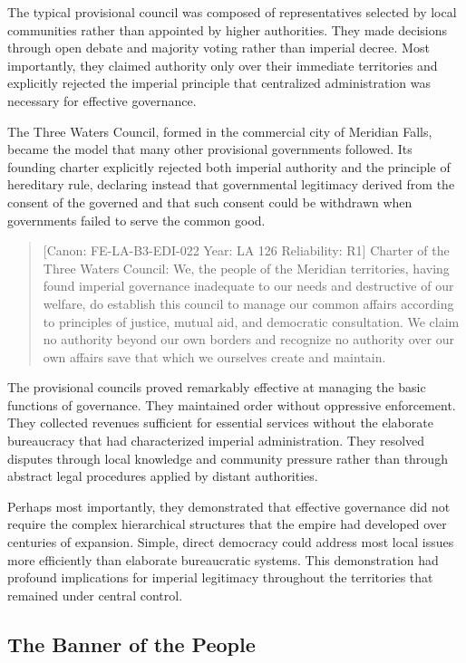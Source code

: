 The typical provisional council was composed of representatives selected
by local communities rather than appointed by higher authorities. They
made decisions through open debate and majority voting rather than
imperial decree. Most importantly, they claimed authority only over
their immediate territories and explicitly rejected the imperial
principle that centralized administration was necessary for effective
governance.

The Three Waters Council, formed in the commercial city of Meridian
Falls, became the model that many other provisional governments
followed. Its founding charter explicitly rejected both imperial
authority and the principle of hereditary rule, declaring instead that
governmental legitimacy derived from the consent of the governed and
that such consent could be withdrawn when governments failed to serve
the common good.

\begin{quote}
{[}Canon: FE-LA-B3-EDI-022 \textbar{} Year: LA 126 \textbar{}
Reliability: R1{]} Charter of the Three Waters Council: We, the people
of the Meridian territories, having found imperial governance inadequate
to our needs and destructive of our welfare, do establish this council
to manage our common affairs according to principles of justice, mutual
aid, and democratic consultation. We claim no authority beyond our own
borders and recognize no authority over our own affairs save that which
we ourselves create and maintain.
\end{quote}

The provisional councils proved remarkably effective at managing the
basic functions of governance. They maintained order without oppressive
enforcement. They collected revenues sufficient for essential services
without the elaborate bureaucracy that had characterized imperial
administration. They resolved disputes through local knowledge and
community pressure rather than through abstract legal procedures applied
by distant authorities.

Perhaps most importantly, they demonstrated that effective governance
did not require the complex hierarchical structures that the empire had
developed over centuries of expansion. Simple, direct democracy could
address most local issues more efficiently than elaborate bureaucratic
systems. This demonstration had profound implications for imperial
legitimacy throughout the territories that remained under central
control.

\subsection{The Banner of the People}\label{the-banner-of-the-people}


